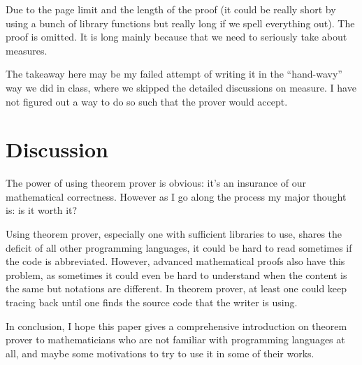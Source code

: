 \documentclass[a4paper]{article}
\theoremstyle{bfnote} %
\theoremstyle{bfnote}                  %
\theoremstyle{example}                       %
\theoremstyle{remark}                       %
\numberwithin{equation}{section}
\begin{document}
Due to the page limit and the length of the proof (it could be really short by using a bunch of library functions but really long if we spell everything out). The proof is omitted. It is long mainly because that we need to seriously take about measures.

The takeaway here may be my failed attempt of writing it in the ``hand-wavy'' way we did in class, where we skipped the detailed discussions on measure. I have not figured out a way to do so such that the prover would accept.

\section{Discussion}
The power of using theorem prover is obvious: it's an insurance of our mathematical correctness. However as I go along the process my major thought is: is it worth it?

Using theorem prover, especially one with sufficient libraries to use, shares the deficit of all other programming languages, it could be hard to read sometimes if the code is abbreviated. However, advanced mathematical proofs also have this problem, as sometimes it could even be hard to understand when the content is the same but notations are different. In theorem prover, at least one could keep tracing back until one finds the source code that the writer is using.

In conclusion, I hope this paper gives a comprehensive introduction on theorem prover to mathematicians who are not familiar with programming languages at all, and maybe some motivations to try to use it in some of their works.

\newpage
\printbibliography
\end{document}
